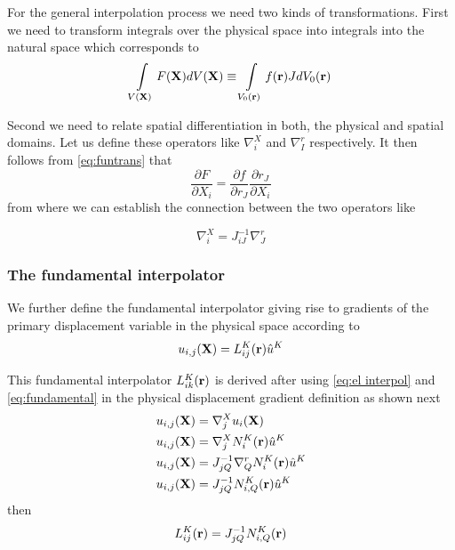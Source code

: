 For the general interpolation process we need two kinds of transformations.  First we need to transform integrals over the physical space into integrals into the natural space which corresponds to
\begin{equation}
\int\limits_{V(\vb{X})} F(\vb{X})dV(\vb{X})\equiv \int\limits_{V_0(\vb{r})} f(\vb{r})J dV_0(\vb{r})
\label{gen trans}
\end{equation}



Second we need to relate spatial differentiation in both, the physical and spatial domains.  Let us define these operators like $\nabla_i^X$ and $\nabla_I^r$ respectively. It then follows from \cref{eq:funtrans} that
\begin{equation}
\dfrac{\partial F}{\partial X_i}=\dfrac{\partial f}{\partial r_J}\dfrac{\partial r_J}{\partial X_i}
\label{eq:chain}
\end{equation}
from where we can establish the connection between the two operators like


\begin{equation}
\nabla_i^X=J_{iJ}^{-1}\nabla_J^r
\label{eq:fundamental}
\end{equation}


\subsubsection*{The fundamental interpolator}
We further define the fundamental interpolator giving rise to gradients of the primary displacement variable in the physical space according to
\begin{equation}
u_{i,j}(\vb{X})=L_{ij}^K(\vb{r})\hat{u}^K
\label{eq:fund operator}
\end{equation}


This fundamental interpolator  $L_{ik}^K(\vb{r})$ is derived after using \cref{eq:el interpol} and \cref{eq:fundamental} in the physical displacement gradient definition as shown next
\begin{align*}
u_{i,j}(\vb{X})&=\nabla_j^X u_i(\vb{X})\\
u_{i,j}(\vb{X})&=\nabla_j^X N_i^K(\vb{r})\hat{u}^K\\
u_{i,j}(\vb{X})&=J_{jQ}^{-1}\nabla_Q^r N_i^K(\vb{r})\hat{u}^K\\
u_{i,j}(\vb{X})&=J_{jQ}^{-1}N_{i,Q}^K(\vb{r})\hat{u}^K
\end{align*}
then
\begin{equation}
L_{ij}^K(\vb{r})=J_{jQ}^{-1}N_{i,Q}^K(\vb{r})
\label{eq:fundamental interpolator}
\end{equation}

